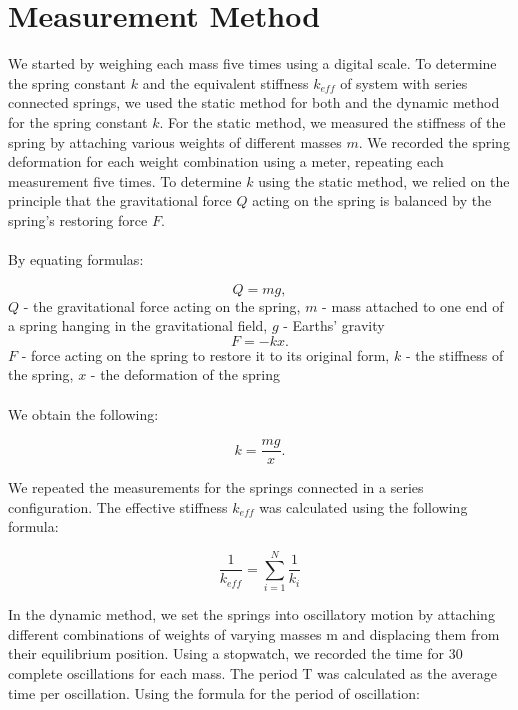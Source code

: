 \documentclass[a4paper,12pt,titlepage,bibliography=numbered]{article}
\begin{document}
\section{Measurement Method}

We started by weighing each mass five times using a digital scale. To determine the spring constant $k$ and the equivalent stiffness $k_{eff}$ of system with series connected springs, we used the static method for both and the dynamic method for the spring constant $k$. For the static method, we measured the stiffness of the spring by attaching various weights of different masses $m$. We recorded the spring deformation for each weight combination using a meter, repeating each measurement five times. To determine $k$ using the static method, we relied on the principle that the gravitational force $Q$ acting on the spring is balanced by the spring's restoring force $F$.\\\\ 
By equating formulas:

\begin{equation}
    Q = mg,
    \label{Gravity}
\end{equation}
$Q$ - the gravitational force acting on the spring, $m$ - mass attached to one end of a spring hanging in the gravitational field, $g$ - Earths' gravity
\begin{equation}
    F = -kx.
    \label{Force}
\end{equation}
$F$ - force acting on the spring to restore it to its original form, $k$ - the stiffness of the spring, $x$ - the deformation of the spring\\\\
\noindent We obtain the following:

\begin{equation}
    k = \frac{mg}{x}. 
    \label{Force}
\end{equation}

\noindent We repeated the measurements for the springs connected in a series configuration.
The effective stiffness $k_{eff}$ was calculated using the following formula:

\begin{equation}
    \frac{1}{k_{eff}} = \sum_{i=1}^N \frac{1}{k_i}
    \label{effective_stiffness}
\end{equation}

\noindent In the dynamic method, we set the springs into oscillatory motion by attaching different combinations of weights of varying masses m and displacing them from their equilibrium position. Using a stopwatch, we recorded the time for 30 complete oscillations for each mass. The period T was calculated as the average time per oscillation. 
Using the formula for the period of oscillation:
\end{document}
